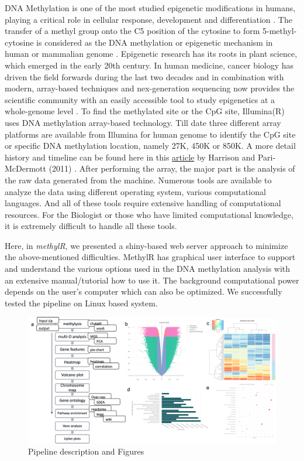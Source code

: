 \documentclass[
  a4paper,
  oneside,
  open=any]{scrreport}
\begin{document}
DNA Methylation is one of the most studied epigenetic modifications in
humans, playing a critical role in cellular response, development and
differentiation \autocite{Das2019}. The transfer of a methyl group onto
the C5 position of the cytosine to form 5-methyl-cytosine is considered
as the DNA methylation or epigenetic mechanism in human or mammalian
genome \autocite{moore2013dna}. Epigenetic research has its roots in
plant science, which emerged in the early 20th century. In human
medicine, cancer biology has driven the field forwards during the last
two decades and in combination with modern, array-based techniques and
nex-generation sequencing now provides the scientific community with an
easily accessible tool to study epigenetics at a whole-genome level
\autocite{das2021dna}. To find the methylated site or the CpG site,
Illumina(R) uses DNA methylation array-based technology. Till date three
different array platforms are available from Illumina for human genome
to identify the CpG site or specific DNA methylation location, namely
27K, 450K or 850K. A more detail history and timeline can be found here
in this
\href{https://www.frontiersin.org/articles/10.3389/fgene.2011.00074/full}{article}
by Harrison and Pari-McDermott (2011) \autocite{harrison2011dna}. After
performing the array, the major part is the analysis of the raw data
generated from the machine. Numerous tools are available to analyze the
data using different operating system, various computational languages.
And all of these tools require extensive handling of computational
resources. For the Biologist or those who have limited computational
knowledge, it is extremely difficult to handle all these tools.

Here, in \emph{methylR}, we presented a shiny-based web server approach
to minimize the above-mentioned difficulties. MethylR has graphical user
interface to support and understand the various options used in the DNA
methylation analysis with an extensive manual/tutorial how to use it.
The background computational power depends on the user's computer which
can also be optimized. We successfully tested the pipeline on Linux
based system.\\

\begin{figure}[H]

{\centering \includegraphics{./_images/Figure1.png}

}

\caption{Pipeline description and Figures}

\end{figure}
\end{document}
